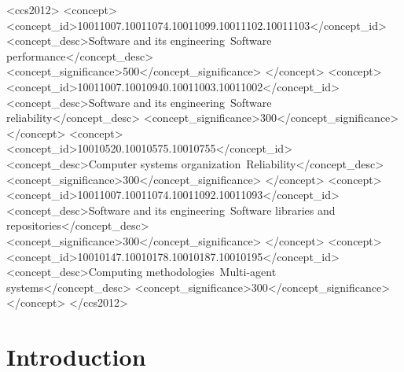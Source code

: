 \documentclass[sigconf,review,anonymous,9pt]{acmart}
\begin{document}
\begin{CCSXML}
<ccs2012>
   <concept>
       <concept_id>10011007.10011074.10011099.10011102.10011103</concept_id>
       <concept_desc>Software and its engineering~Software performance</concept_desc>
       <concept_significance>500</concept_significance>
       </concept>
   <concept>
       <concept_id>10011007.10010940.10011003.10011002</concept_id>
       <concept_desc>Software and its engineering~Software reliability</concept_desc>
       <concept_significance>300</concept_significance>
       </concept>
   <concept>
       <concept_id>10010520.10010575.10010755</concept_id>
       <concept_desc>Computer systems organization~Reliability</concept_desc>
       <concept_significance>300</concept_significance>
       </concept>
   <concept>
       <concept_id>10011007.10011074.10011092.10011093</concept_id>
       <concept_desc>Software and its engineering~Software libraries and repositories</concept_desc>
       <concept_significance>300</concept_significance>
       </concept>
   <concept>
       <concept_id>10010147.10010178.10010187.10010195</concept_id>
       <concept_desc>Computing methodologies~Multi-agent systems</concept_desc>
       <concept_significance>300</concept_significance>
       </concept>
 </ccs2012>
\end{CCSXML}



\maketitle

\section{Introduction}
\end{document}
